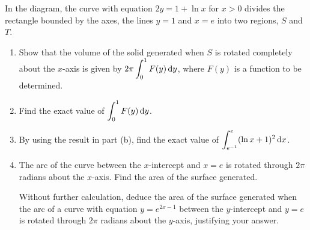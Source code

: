 \documentclass{echw}
\begin{document}

    \problem{}
        In the diagram, the curve with equation $2y = 1 + \ln x$ for $x > 0$ divides the rectangle bounded by the axes, the lines $y = 1$ and $x = e$ into two regions, $S$ and $T$.

        \begin{center}
        \end{center}

        \begin{enumerate}
            \item Show that the volume of the solid generated when $S$ is rotated completely about the $x$-axis is given by $2\pi \displaystyle\int_0^1 F(y) \mathop{\mathrm{d}y}$, where $F(y)$ is a function to be determined.
            \item Find the exact value of $\displaystyle\int_0^1 F(y) \mathop{\mathrm{d}y}$.
            \item By using the result in part (b), find the exact value of $\displaystyle\int_{e^{-1}}^e (\ln x + 1)^2 \mathop{\mathrm{d}x}$.
            \item The arc of the curve between the $x$-intercept and $x = e$ is rotated through $2\pi$ radians about the $x$-axis. Find the area of the surface generated.
            
            Without further calculation, deduce the area of the surface generated when the arc of a curve with equation $y = e^{2x-1}$ between the $y$-intercept and $y = e$ is rotated through $2\pi$ radians about the $y$-axis, justifying your answer.
        \end{enumerate}
\end{document}
